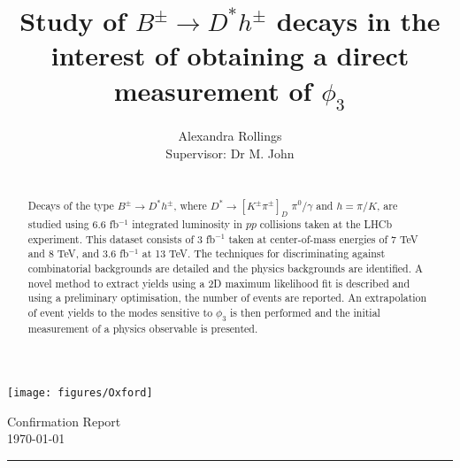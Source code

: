 \documentclass[oneside,12pt]{article}
\title{ \LARGE \textbf{Study of $B^{\pm} \rightarrow D^{*}h^{\pm}$ decays in the
interest of obtaining a direct measurement of $\phi_3$} \\ }
\author{
		Alexandra Rollings\\	
		Supervisor: Dr M. John\\	
}
\makeatletter
\newcommand{\HRule}[1]{\rule{\linewidth}{#1}}     %
\def\printtitle{%
  {\centering \@title\par}}
\def\printauthor{%
  {\centering \large \@author}}
\makeatother
\begin{document}
\begin{titlepage}
\begin{nolinenumbers}
\thispagestyle{empty} 

\begin{minipage}[c]{.15\linewidth}
  \texttt{[image: figures/Oxford]}
\end{minipage}\hfill
\begin{minipage}[c]{.75\linewidth}
  \begin{flushright}
  \normalsize {Confirmation Report} 	%
  \\ \normalsize \today			%
  \end{flushright}
\end{minipage}



\HRule{0.5pt} \\						%
[2.0cm]
\printtitle 
\vspace{75pt}
\printauthor
\vfill
\begin{abstract}
\noindent
\\
Decays of the type $B^{\pm} \rightarrow D^{*}h^{\pm}$, where $D^{*} \rightarrow
[K^{\pm}\pi^{\pm}]_D$ $\pi^{0}\text{/}\gamma$ and $h=\pi/K$, are studied using
6.6 fb$^{-1}$ integrated luminosity in $pp$ collisions taken at the LHCb
experiment. This dataset consists of 3 fb${^{-1}}$ taken at center-of-mass
energies of 7 TeV and 8 TeV, and 3.6 fb${^{-1}}$ at 13 TeV. The techniques for
discriminating against combinatorial backgrounds are detailed and the physics
backgrounds are identified. A novel method to extract yields using a 2D maximum
likelihood fit is described and using a preliminary optimisation, the number of
events are reported. An extrapolation of event yields to the modes sensitive to
$\phi_3$ is then performed and the initial measurement of a physics observable
is presented.
\end{abstract}
\vfill
\end{nolinenumbers}
\end{titlepage}
\setcounter{page}{1}
\end{document}
